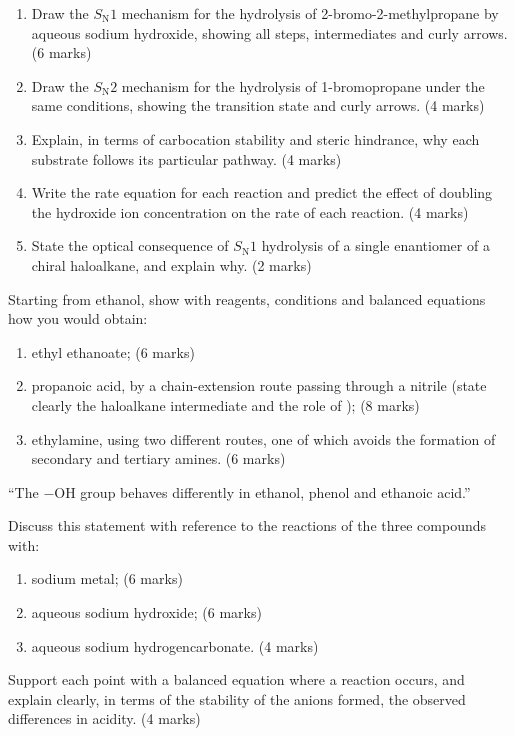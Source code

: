 \documentclass[11pt]{article}
\begin{document}
\begin{exercice}
\begin{enumerate}
\item Draw the $S_{\mathrm{N}}1$ mechanism for the hydrolysis of 2-bromo-2-methylpropane by aqueous sodium hydroxide, showing all steps, intermediates and curly arrows. \hfill (6 marks)
\item Draw the $S_{\mathrm{N}}2$ mechanism for the hydrolysis of 1-bromopropane under the same conditions, showing the transition state and curly arrows. \hfill (4 marks)
\item Explain, in terms of carbocation stability and steric hindrance, why each substrate follows its particular pathway. \hfill (4 marks)
\item Write the rate equation for each reaction and predict the effect of doubling the hydroxide ion concentration on the rate of each reaction. \hfill (4 marks)
\item State the optical consequence of $S_{\mathrm{N}}1$ hydrolysis of a single enantiomer of a chiral haloalkane, and explain why. \hfill (2 marks)
\end{enumerate}
\end{exercice}

\begin{exercice}
Starting from ethanol, show with reagents, conditions and balanced equations how you would obtain:
\begin{enumerate}
\item ethyl ethanoate; \hfill (6 marks)
\item propanoic acid, by a chain-extension route passing through a nitrile (state clearly the haloalkane intermediate and the role of ); \hfill (8 marks)
\item ethylamine, using two different routes, one of which avoids the formation of secondary and tertiary amines. \hfill (6 marks)
\end{enumerate}
\end{exercice}

\begin{exercice}
``The $-\mathrm{OH}$ group behaves differently in ethanol, phenol and ethanoic acid.''

Discuss this statement with reference to the reactions of the three compounds with:
\begin{enumerate}
\item sodium metal; \hfill (6 marks)
\item aqueous sodium hydroxide; \hfill (6 marks)
\item aqueous sodium hydrogencarbonate. \hfill (4 marks)
\end{enumerate}
Support each point with a balanced equation where a reaction occurs, and explain clearly, in terms of the stability of the anions formed, the observed differences in acidity. \hfill (4 marks)
\end{exercice}
\end{document}
